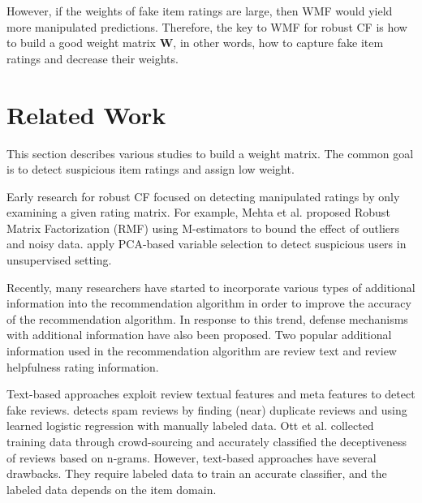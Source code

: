 \documentclass[master,english,final]{kaist-ucs}
\begin{document}
However, if the weights of fake item ratings are large, then WMF would yield more manipulated predictions.
Therefore, the key to WMF for robust CF is how to build a good weight matrix $\bm{W}$, in other words, how to capture fake item ratings and decrease their weights.



\chapter{Related Work}
This section describes various studies to build a weight matrix.
The common goal is to detect suspicious item ratings and assign low weight.

Early research for robust CF focused on detecting manipulated ratings by only examining a given rating matrix.
For example, Mehta et al. \cite{RMF} proposed Robust Matrix Factorization (RMF) using M-estimators to bound the effect of outliers and noisy data.
\cite{LiesAndPropaganda,UnsupervisedShilling,AttackResistant} apply PCA-based variable selection to detect suspicious users in unsupervised setting.

Recently, many researchers have started to incorporate various types of additional information into the recommendation algorithm in order to improve the accuracy of the recommendation algorithm.
In response to this trend, defense mechanisms with additional information have also been proposed.
Two popular additional information used in the recommendation algorithm are review text and review helpfulness rating information.

Text-based approaches \cite{text_duplicate, text_crowd,text_opinion_summarization,naive_helpfulness} exploit review textual features and meta features to detect fake reviews.
\cite{text_duplicate} detects spam reviews by finding (near) duplicate reviews and using learned logistic regression with manually labeled data.
Ott et al. \cite{text_crowd} collected training data through crowd-sourcing and accurately classified the deceptiveness of reviews based on n-grams.
However, text-based approaches have several drawbacks.
They require labeled data to train an accurate classifier, and the labeled data depends on the item domain.
\end{document}
